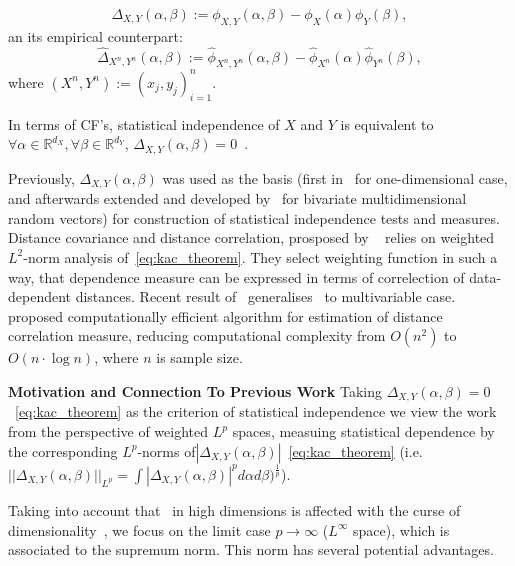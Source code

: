 \documentclass{article}
\begin{document}
\begin{equation}
\label{eq:kac_theorem}
\Delta_{X,Y}(\alpha, \beta) := \phi_{X,Y}(\alpha,\beta) - \phi_{X}(\alpha) \phi_{Y}(\beta),
\end{equation}
an its empirical counterpart:
\begin{equation}
\label{eq:empirical_delta}
\widehat{\Delta}_{X^{n},Y^{n}}(\alpha, \beta) := \widehat{\phi}_{X^{n},Y^{n}}(\alpha,\beta) - \widehat{\phi}_{X^{n}}(\alpha) \widehat{\phi}_{Y^{n}}(\beta),
\end{equation}
where $(X^{n},Y^{n}) := (x_{j}, y_{j})_{i=1}^{n}$.

In terms of CF's, statistical independence  of $X$ and $Y$ is equivalent to $\forall \alpha \in \mathbb{R}^{d_X},\forall \beta \in \mathbb{R}^{d_Y} $, $\Delta_{X,Y}(\alpha, \beta) = 0$~\cite{KacTheorem}.

Previously, $\Delta_{X,Y}(\alpha, \beta)$ was used as the basis (first in~\cite{Feuerverger} for one-dimensional case, and afterwards extended and developed by~\cite{Szekely} for bivariate multidimensional random vectors) for construction of statistical independence tests and measures. Distance covariance and distance correlation, prosposed by ~\cite{Szekely} relies on weighted $L^{2}$-norm analysis of~\eqref{eq:kac_theorem}. They select weighting function in such a way, that dependence measure can be expressed in terms of correlection of data-dependent distances. Recent result of~\cite{Bottcher} generalises~\cite{Szekely} to multivariable case.~\cite{CHAUDHURI201915} proposed computationally efficient algorithm for estimation of distance correlation measure, reducing computational complexity from $O(n^2)$ to $O(n\cdot \log n)$, where $n$ is sample size.

\textbf{Motivation and Connection To Previous Work} 
Taking $\Delta_{X,Y}(\alpha, \beta) = 0$~\eqref{eq:kac_theorem} as the criterion of statistical independence we view the work~\cite{Szekely} from the perspective of weighted $L^{p}$ spaces, measuing statistical dependence by the corresponding $L^{p}$-norms of$|\Delta_{X,Y}(\alpha, \beta)|$~\eqref{eq:kac_theorem} (i.e. $||\Delta_{X,Y}(\alpha, \beta)||_{L^{p}} = \int |\Delta_{X,Y}(\alpha, \beta)|^{p} d\alpha d\beta)^{\frac{1}{p}}$).

Taking into account that~\cite{Szekely} in high dimensions is affected with the curse of dimensionality~\cite{Edlemann}, we focus on the limit case $p \rightarrow \infty$ ($L^{\infty}$ space), which is associated to the supremum norm. This norm has several potential advantages.
\end{document}

